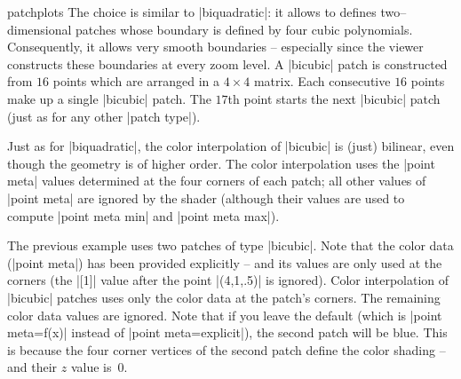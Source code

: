 {\begin{pgfplotslibrary}{patchplots}
	The choice  is similar to |biquadratic|: it allows to defines two--dimensional patches whose boundary is defined by four cubic polynomials. Consequently, it allows very smooth boundaries -- especially since the viewer constructs these boundaries at every zoom level. A |bicubic| patch is constructed from $16$ points which are arranged in a $4\times4$ matrix. Each consecutive $16$ points make up a single |bicubic| patch. The $17$th point starts the next |bicubic| patch (just as for any other |patch type|).
\begin{codeexample}[]
\end{codeexample}
	Just as for |biquadratic|, the color interpolation of |bicubic| is (just) bilinear, even though the geometry is of higher order. The color interpolation uses the |point meta| values determined at the four corners of each patch; all other values of |point meta| are ignored by the shader (although their values are used to compute |point meta min| and |point meta max|).
\begin{codeexample}[]
\end{codeexample}
	The previous example uses two patches of type |bicubic|. Note that the color data (|point meta|) has been provided explicitly -- and its values are only used at the corners (the |[1]| value after the point |(4,1,.5)| is ignored). Color interpolation of |bicubic| patches uses only the color data at the patch's corners. The remaining color data values are ignored. Note that if you leave the default (which is |point meta=f(x)| instead of |point meta=explicit|), the second patch will be blue. This is because the four corner vertices of the second patch define the color shading -- and their $z$ value is~$0$.


\end{pgfplotslibrary}}

